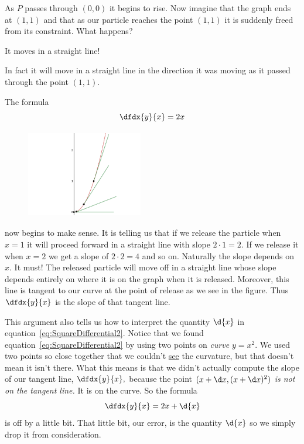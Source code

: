 

As $P$ passes through $(0,0)$ it begins to rise. Now imagine that the
graph ends at $(1,1)$ and that as our particle reaches the point
$(1,1)$ it is suddenly freed from its constraint. What happens?

It moves in a straight line! 

In fact it will move in a straight line in the direction it was moving
as it passed through the point $(1,1).$ 



The formula 
\[\dfdx{y}{x} = 2x\]
\begin{figure}
\captionsetup{labelformat=empty}
\centerline{\includegraphics*[height=1.5in,width=2in]{Figures/SquareFunctionTangent}}
\label{fig:SquareFunctionTangent}
\end{figure}
now begins to make sense. It is telling us that if we release the
particle when $x=1$ it will proceed forward in a straight line with
slope $2\cdot1=2.$ If we release it when $x=2$ we get a slope of
$2\cdot2=4$ and so on. Naturally the slope depends on $x.$ It must!
The released particle will move off in a straight line whose slope
depends entirely on where it is on the graph when it is released.
Moreover, this line is tangent to our curve at the point of release as
we see in the figure.
Thus $\dfdx{y}{x}$ is the slope of that tangent line.

This argument also tells us how to interpret the quantity $\d{x}$
in equation~\ref{eq:SquareDifferential2}. Notice that we found
equation~\ref{eq:SquareDifferential2} by using two points on
\emph{curve} $y=x^2.$ We used two points so close together that we
couldn't \underline{see} the curvature, but that doesn't mean it isn't
there. What this means is that we didn't actually compute the slope
of our tangent line, $\dfdx{y}{x},$ because the point $(x+\d x, (x+\d
x)^2)$ \emph{is not on the tangent line.} It is on the curve. So the
formula
\[\dfdx{y}{x} = 2x+\d{x}\]
is off by a little bit. That little bit, our error, is the quantity
$\d{x}$ so we simply drop it from consideration.

